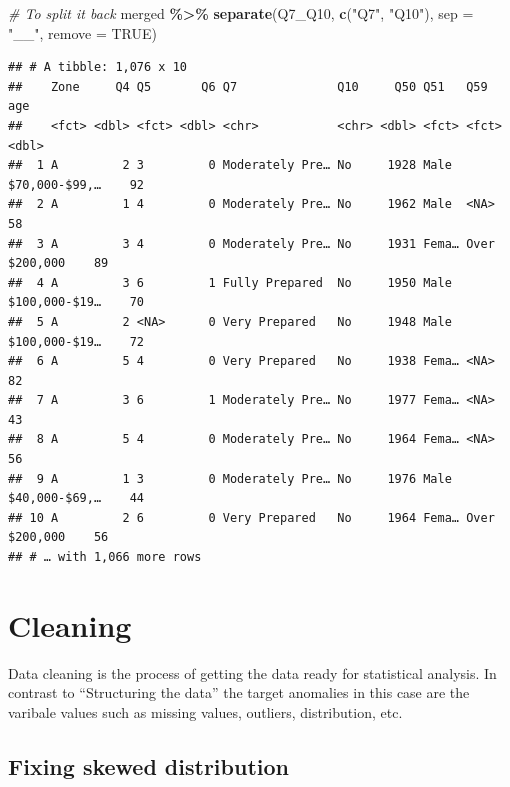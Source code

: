 \documentclass[
]{book}
\newenvironment{Shaded}{\begin{snugshade}}{\end{snugshade}}
\newcommand{\CommentTok}[1]{\textcolor[rgb]{0.56,0.35,0.01}{\textit{#1}}}
\newcommand{\DataTypeTok}[1]{\textcolor[rgb]{0.13,0.29,0.53}{#1}}
\newcommand{\KeywordTok}[1]{\textcolor[rgb]{0.13,0.29,0.53}{\textbf{#1}}}
\newcommand{\NormalTok}[1]{#1}
\newcommand{\OperatorTok}[1]{\textcolor[rgb]{0.81,0.36,0.00}{\textbf{#1}}}
\newcommand{\OtherTok}[1]{\textcolor[rgb]{0.56,0.35,0.01}{#1}}
\newcommand{\StringTok}[1]{\textcolor[rgb]{0.31,0.60,0.02}{#1}}
\begin{document}
\begin{Shaded}
\begin{Highlighting}[]
\CommentTok{\# To split it back}
\NormalTok{merged }\OperatorTok{\%\textgreater{}\%}\StringTok{ }\KeywordTok{separate}\NormalTok{(Q7\_Q10, }\KeywordTok{c}\NormalTok{(}\StringTok{"Q7"}\NormalTok{, }\StringTok{"Q10"}\NormalTok{), }\DataTypeTok{sep =} \StringTok{"\_\_"}\NormalTok{, }\DataTypeTok{remove =} \OtherTok{TRUE}\NormalTok{)}
\end{Highlighting}
\end{Shaded}

\begin{verbatim}
## # A tibble: 1,076 x 10
##    Zone     Q4 Q5       Q6 Q7              Q10     Q50 Q51   Q59             age
##    <fct> <dbl> <fct> <dbl> <chr>           <chr> <dbl> <fct> <fct>         <dbl>
##  1 A         2 3         0 Moderately Pre… No     1928 Male  $70,000-$99,…    92
##  2 A         1 4         0 Moderately Pre… No     1962 Male  <NA>             58
##  3 A         3 4         0 Moderately Pre… No     1931 Fema… Over $200,000    89
##  4 A         3 6         1 Fully Prepared  No     1950 Male  $100,000-$19…    70
##  5 A         2 <NA>      0 Very Prepared   No     1948 Male  $100,000-$19…    72
##  6 A         5 4         0 Very Prepared   No     1938 Fema… <NA>             82
##  7 A         3 6         1 Moderately Pre… No     1977 Fema… <NA>             43
##  8 A         5 4         0 Moderately Pre… No     1964 Fema… <NA>             56
##  9 A         1 3         0 Moderately Pre… No     1976 Male  $40,000-$69,…    44
## 10 A         2 6         0 Very Prepared   No     1964 Fema… Over $200,000    56
## # … with 1,066 more rows
\end{verbatim}

\hypertarget{cleaning}{%
\chapter{Cleaning}\label{cleaning}}

Data cleaning is the process of getting the data ready for statistical analysis. In contrast to ``Structuring the data'' the target anomalies in this case are the varibale values such as missing values, outliers, distribution, etc.

\hypertarget{fixing-skewed-distribution}{%
\section{Fixing skewed distribution}\label{fixing-skewed-distribution}}
\end{document}
